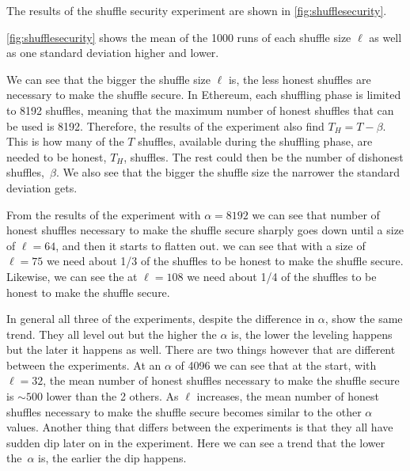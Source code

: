 The results of the shuffle security experiment are shown in \autoref{fig:shufflesecurity}.

\autoref{fig:shufflesecurity} shows the mean of the 1000 runs of each shuffle size $\ell$ as well as one standard deviation higher and lower.

We can see that the bigger the shuffle size $\ell$ is, the less honest shuffles are necessary to make the shuffle secure.
In Ethereum, each shuffling phase is limited to 8192 shuffles, meaning that the maximum number of honest shuffles that can be used is 8192.
Therefore, the results of the experiment also find $T_H=T-\beta$.
This is how many of the $T$ shuffles, available during the shuffling phase, are needed to be honest, $T_H$, shuffles.
The rest could then be the number of dishonest shuffles,~$\beta$.
We also see that the bigger the shuffle size the narrower the standard deviation gets.

From the results of the experiment with $\alpha=8192$ we can see that number of honest shuffles necessary to make the shuffle secure sharply goes down until a size of $\ell=64$, and then it starts to flatten out.
we can see that with a size of $\ell=75$ we need about 1/3 of the shuffles to be honest to make the shuffle secure.
Likewise, we can see the at $\ell=108$ we need about 1/4 of the shuffles to be honest to make the shuffle secure.

In general all three of the experiments, despite the difference in $\alpha$, show the same trend.
They all level out but the higher the $\alpha$ is, the lower the leveling happens but the later it happens as well.
There are two things however that are different between the experiments.
At an $\alpha$ of 4096 we can see that at the start, with $\ell=32$, the mean number of honest shuffles necessary to make the shuffle secure is $\sim500$ lower than the 2 others.
As $\ell$ increases, the mean number of honest shuffles necessary to make the shuffle secure becomes similar to the other $\alpha$ values.
Another thing that differs between the experiments is that they all have sudden dip later on in the experiment.
Here we can see a trend that the lower the~$\alpha$ is, the earlier the dip happens.

